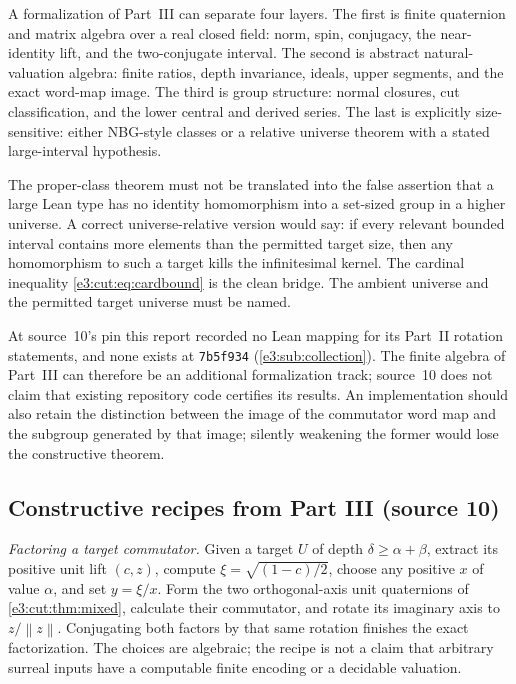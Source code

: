 \documentclass[11pt,letterpaper]{article}
\numberwithin{equation}{section}
\theoremstyle{definition}
\theoremstyle{remark}
\newcommand{\norm}[1]{\left\lVert#1\right\rVert}
\begin{document}
A formalization of Part~III can separate four layers. The first is finite
quaternion and matrix algebra over a real closed field: norm, spin, conjugacy,
the near-identity lift, and the two-conjugate interval. The second is abstract
natural-valuation algebra: finite ratios, depth invariance, ideals, upper
segments, and the exact word-map image. The third is group structure: normal
closures, cut classification, and the lower central and derived series. The
last is explicitly size-sensitive: either NBG-style classes or a relative
universe theorem with a stated large-interval hypothesis.

The proper-class theorem must not be translated into the false assertion that a
large Lean type has no identity homomorphism into a set-sized group in a higher
universe. A correct universe-relative version would say: if every relevant
bounded interval contains more elements than the permitted target size, then
any homomorphism to such a target kills the infinitesimal kernel. The cardinal
inequality \cref{e3:cut:eq:cardbound} is the clean bridge. The ambient universe
and the permitted target universe must be named.

At source~10's pin this report recorded no Lean mapping for its Part~II rotation
statements, and none exists at \texttt{7b5f934} (\cref{e3:sub:collection}). The
finite algebra of Part~III can therefore be an additional formalization track;
source~10 does not claim that existing repository code certifies its results.
An implementation should also retain the distinction between the image of the
commutator word map and the subgroup generated by that image; silently weakening
the former would lose the constructive theorem.

\subsection{Constructive recipes from Part III (source 10)}\label{e3:cut:sub:recipes}

\emph{Factoring a target commutator.} Given a target $U$ of depth
$\delta\ge\alpha+\beta$, extract its positive unit lift $(c,z)$, compute
$\xi=\sqrt{(1-c)/2}$, choose any positive $x$ of value $\alpha$, and set
$y=\xi/x$. Form the two orthogonal-axis unit quaternions of
\cref{e3:cut:thm:mixed}, calculate their commutator, and rotate its imaginary
axis to $z/\norm z$. Conjugating both factors by that same rotation finishes the
exact factorization. The choices are algebraic; the recipe is not a claim that
arbitrary surreal inputs have a computable finite encoding or a decidable
valuation.
\end{document}

